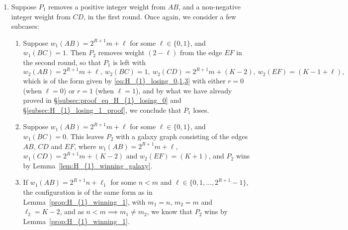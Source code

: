 \documentclass[11pt,reqno]{amsart}
\theoremstyle{definition}
\theoremstyle{definition}
\begin{document}
\begin{enumerate}
\begin{enumerate}
\item If $w_{1}(CD)=2^{R+1}n+\ell_{1}$ for some $n < m$ and $\ell\in\{0,1,\ldots,2^{R+1}-1\}$, the configuration is of the same form as in Lemma~\ref{prop:H_{1}_winning_1}, with $m_{1}=n$, $m_{2}=m$ and $\ell_{2}=2$, and as $n < m \implies m_{1}\neq m_{2}$, we know that $P_{2}$ wins by Lemma~\ref{prop:H_{1}_winning_1}.
\end{enumerate}

\item Suppose $P_{1}$ removes a positive integer weight from $AB$, and a non-negative integer weight from $CD$, in the first round. Once again, we consider a few subcases:
\begin{enumerate}
\item Suppose $w_{1}(AB)=2^{R+1}m+\ell$ for some $\ell \in \{0,1\}$, and $w_{1}(BC)=1$. Then $P_{2}$ removes weight $(2-\ell)$ from the edge $EF$ in the second round, so that $P_{1}$ is left with 
\begin{equation}
w_{2}(AB)=2^{R+1}m+\ell,\ w_{2}(BC)=1,\ w_{2}(CD)=2^{R+1}m+(K-2),\ w_{2}(EF)=(K-1+\ell),\nonumber
\end{equation}
which is of the form given by \eqref{eq:H_{1}_losing_0,1,3} with either $r=0$ (when $\ell=0$) or $r=1$ (when $\ell=1$), and by what we have already proved in \S\ref{subsec:proof_eq_H_{1}_losing_0} and \S\ref{subsec:H_{1}_losing_1_proof}, we conclude that $P_{1}$ loses. 

\item Suppose $w_{1}(AB)=2^{R+1}m+\ell$ for some $\ell \in \{0,1\}$, and $w_{1}(BC)=0$. This leaves $P_{2}$ with a galaxy graph consisting of the edges $AB$, $CD$ and $EF$, where $w_{1}(AB)=2^{R+1}m+\ell$, $w_{1}(CD)=2^{R+1}m+(K-2)$ and $w_{2}(EF)=(K+1)$, and $P_{2}$ wins by Lemma~\ref{lem:H_{1}_winning_galaxy}.

\item If $w_{1}(AB)=2^{R+1}n+\ell_{1}$ for some $n < m$ and $\ell\in\{0,1,\ldots,2^{R+1}-1\}$, the configuration is of the same form as in Lemma~\ref{prop:H_{1}_winning_1}, with $m_{1}=n$, $m_{2}=m$ and $\ell_{2}=K-2$, and as $n < m \implies m_{1}\neq m_{2}$, we know that $P_{2}$ wins by Lemma~\ref{prop:H_{1}_winning_1}.
\end{enumerate}


\end{enumerate}
\end{document}
